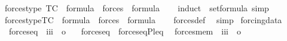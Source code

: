 \begin{isabellebody}
\isanewline
{}\isamarkupfalse%
\ forces{\isacharprime}{\kern0pt}{\isacharunderscore}{\kern0pt}type\ {\isacharbrackleft}{\kern0pt}TC{\isacharbrackright}{\kern0pt}{\isacharcolon}{\kern0pt}\ \ {\isachardoublequoteopen}{\isasymphi}{\isasymin}formula\ {\isasymLongrightarrow}\ forces{\isacharprime}{\kern0pt}{\isacharparenleft}{\kern0pt}{\isasymphi}{\isacharparenright}{\kern0pt}\ {\isasymin}\ formula{\isachardoublequoteclose}\isanewline
%
\isadelimproof
\ \ %
\endisadelimproof
%
\isatagproof
{}\isamarkupfalse%
\ {\isacharparenleft}{\kern0pt}induct\ {\isasymphi}\ set{\isacharcolon}{\kern0pt}formula{\isacharsemicolon}{\kern0pt}\ simp{\isacharparenright}{\kern0pt}%
\endisatagproof
{\isafoldproof}%
%
\isadelimproof
\isanewline
%
\endisadelimproof
\isanewline
{}\isamarkupfalse%
\ forces{\isacharunderscore}{\kern0pt}type{\isacharbrackleft}{\kern0pt}TC{\isacharbrackright}{\kern0pt}\ {\isacharcolon}{\kern0pt}\ {\isachardoublequoteopen}{\isasymphi}{\isasymin}formula\ {\isasymLongrightarrow}\ forces{\isacharparenleft}{\kern0pt}{\isasymphi}{\isacharparenright}{\kern0pt}\ {\isasymin}\ formula{\isachardoublequoteclose}\isanewline
%
\isadelimproof
\ \ %
\endisadelimproof
%
\isatagproof
{}\isamarkupfalse%
\ forces{\isacharunderscore}{\kern0pt}def\ \isamarkupfalse%
\ simp%
\endisatagproof
{\isafoldproof}%
%
\isadelimproof
\isanewline
%
\endisadelimproof
\isanewline
{}\isamarkupfalse%
\ forcing{\isacharunderscore}{\kern0pt}data\isanewline
{}%
\isadelimdocument
%
\endisadelimdocument
%
\isatagdocument
%
\isamarkuptrue%
%
\endisatagdocument
{\isafolddocument}%
%
\isadelimdocument
%
\endisadelimdocument
{}\isamarkupfalse%
\isanewline
\ \ forces{\isacharunderscore}{\kern0pt}eq\ {\isacharcolon}{\kern0pt}{\isacharcolon}{\kern0pt}\ {\isachardoublequoteopen}{\isacharbrackleft}{\kern0pt}i{\isacharcomma}{\kern0pt}i{\isacharcomma}{\kern0pt}i{\isacharbrackright}{\kern0pt}\ {\isasymRightarrow}\ o{\isachardoublequoteclose}\ \isanewline
\ \ {\isachardoublequoteopen}forces{\isacharunderscore}{\kern0pt}eq\ {\isasymequiv}\ forces{\isacharunderscore}{\kern0pt}eq{\isacharprime}{\kern0pt}{\isacharparenleft}{\kern0pt}P{\isacharcomma}{\kern0pt}leq{\isacharparenright}{\kern0pt}{\isachardoublequoteclose}\isanewline
\isanewline
{}\isamarkupfalse%
\isanewline
\ \ forces{\isacharunderscore}{\kern0pt}mem\ {\isacharcolon}{\kern0pt}{\isacharcolon}{\kern0pt}\ {\isachardoublequoteopen}{\isacharbrackleft}{\kern0pt}i{\isacharcomma}{\kern0pt}i{\isacharcomma}{\kern0pt}i{\isacharbrackright}{\kern0pt}\ {\isasymRightarrow}\ o{\isachardoublequoteclose}\ \isanewline

\end{isabellebody}
